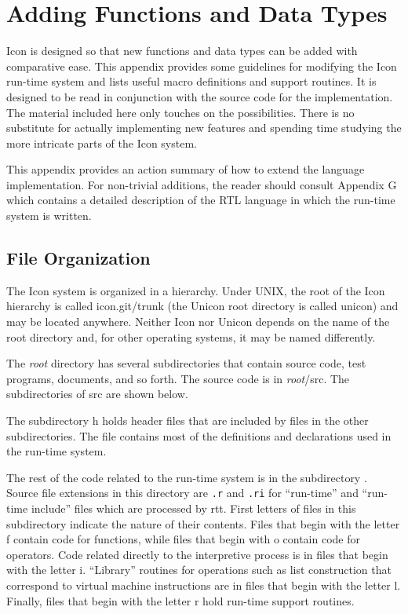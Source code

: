 \tablehead{}
\tablefirsthead{}
\tabletail{}
\tablelasttail{}

\chapter{Adding Functions and Data Types}

Icon is designed so that new functions and data types can be added
with comparative ease.  This appendix provides some guidelines for
modifying the Icon run-time system and lists useful macro definitions
and support routines. It is designed to be read in conjunction with
the source code for the implementation. The material included here
only touches on the possibilities. There is no substitute for actually
implementing new features and spending time studying the more
intricate parts of the Icon system.

This appendix provides an action summary of how to extend the language
implementation. For non-trivial additions, the reader should consult
Appendix G which contains a detailed description of the RTL language
in which the run-time system is written.


\section{File Organization}

The Icon system is organized in a hierarchy. Under UNIX, the root of
the Icon hierarchy is called icon.git/trunk {\color{blue} (the Unicon
root directory is called unicon)} and may be located anywhere.
Neither Icon nor Unicon depends on the name of the root directory and,
for other operating systems, it may be named differently.

The {\it root} directory has several subdirectories that contain
source code, test programs, documents, and so forth. The source code
is in {\it root}/src.  The subdirectories of src are shown below.

The subdirectory h holds header files that are included by files in
the other subdirectories. The file  contains most of
the definitions and declarations used in the run-time system.

The rest of the code related to the run-time system is in the
subdirectory . Source file extensions in this
directory are \texttt{.r} and \texttt{.ri} for ``run-time'' and
``run-time include'' files which are processed by rtt.
First letters of files in this
subdirectory indicate the nature of their contents. Files that begin
with the letter f contain code for functions, while files that begin
with o contain code for operators. Code related directly to the
interpretive process is in files that begin with the letter
i. ``Library'' routines for operations such as list construction that
correspond to virtual machine instructions are in files that begin
with the letter l. Finally, files that begin with the letter r hold
run-time support routines.

